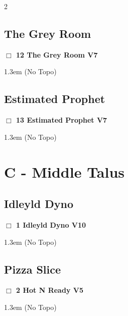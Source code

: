 \begin{multicols}{2}
\subsection*{The Grey Room}\label{bf:The Grey Room}
\needspace{2em}
\label{rt:The Grey Room}
\colorbox{Goldenrod!50}{
\parbox{0.95\linewidth}{
\hspace{-1ex}\textbf{$\Box$
12 The Grey Room V7  
}}}
\begin{adjustwidth}{1.3em}{}			
  (No Topo)
\end{adjustwidth}
\needspace{10em}
\subsection*{Estimated Prophet}\label{bf:Estimated Prophet}
\needspace{2em}
\label{rt:Estimated Prophet}
\colorbox{Goldenrod!50}{
\parbox{0.95\linewidth}{
\hspace{-1ex}\textbf{$\Box$
13 Estimated Prophet V7  
}}}
\begin{adjustwidth}{1.3em}{}			
  (No Topo)
\end{adjustwidth}
\newpage
\section{C - Middle Talus}\label{sa:Middle Talus}
\needspace{10em}
\subsection*{Idleyld Dyno}\label{bf:Idleyld Dyno}
\needspace{2em}
\label{rt:Idleyld Dyno}
\colorbox{red!20}{
\parbox{0.95\linewidth}{
\hspace{-1ex}\textbf{$\Box$
1 Idleyld Dyno V10  
}}}
\begin{adjustwidth}{1.3em}{}			
  (No Topo)
\end{adjustwidth}
\needspace{10em}
\subsection*{Pizza Slice}\label{bf:Pizza Slice}
\needspace{2em}
\label{rt:Hot N Ready}
\colorbox{RoyalBlue!20}{
\parbox{0.95\linewidth}{
\hspace{-1ex}\textbf{$\Box$
2 Hot N Ready V5  
}}}
\begin{adjustwidth}{1.3em}{}			
  (No Topo)
\end{adjustwidth}
\needspace{10em}

\end{multicols}
